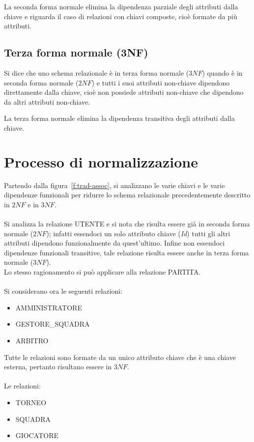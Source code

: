 	La seconda forma normale elimina la dipendenza parziale degli attributi dalla chiave e riguarda il caso di relazioni con chiavi composte, cioè formate da più attributi.
	
	\subsection{Terza forma normale (3NF)}
	Si dice che uno schema relazionale è in terza forma normale ($3NF$) quando è in seconda forma normale ($2NF$) e tutti i suoi attributi non-chiave dipendono direttamente dalla chiave, cioè non possiede attributi non-chiave che dipendono da altri attributi non-chiave.
	
	La terza forma normale elimina la dipendenza transitiva degli attributi dalla chiave.
	
\section{Processo di normalizzazione}
Partendo dalla figura~\vref{f:trad-assoc}, si analizzano le varie chiavi e le varie dipendenze funzionali per ridurre lo schema relazionale precedentemente descritto in $2NF$ e in $3NF$. \\
\\
Si analizza la relazione UTENTE e si nota che risulta essere già in seconda forma normale ($2NF$);
infatti essendoci un solo attributo chiave (\emph{Id}) tutti gli altri attributi dipendono funzionalmente da quest'ultimo.
Infine non essendoci dipendenze funzionali transitive, tale relazione risulta essere anche in terza forma normale ($3NF$).
\\
Lo stesso ragionamento si può applicare alla relazione PARTITA. \\
\\
Si considerano ora le seguenti relazioni:
\begin{itemize}
	
	\item
	AMMINISTRATORE
	
	\item
	GESTORE\_SQUADRA
	
	\item
	ARBITRO
	
\end{itemize}
Tutte le relazioni sono formate da un unico attributo chiave che è una chiave esterna, pertanto risultano essere in $3NF$. \\
\\
Le relazioni:
\begin{itemize}
	
	\item
	TORNEO
	
	\item
	SQUADRA
	
	\item
	GIOCATORE
	
\end{itemize}
